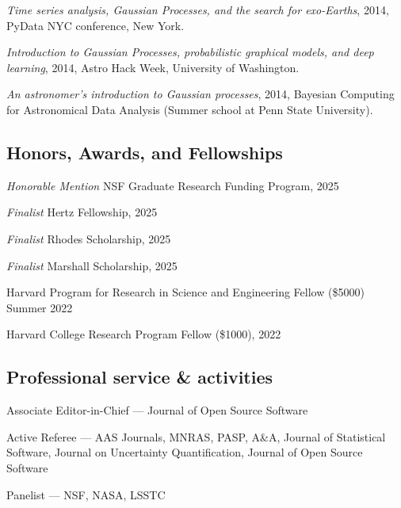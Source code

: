 \documentclass[12pt,letterpaper]{article}
\begin{document}
\begin{list}{}{\cvlist}
  \item \emph{Time series analysis, Gaussian Processes, and the search for
          exo-Earths},
        2014, PyData NYC conference, New York.

  \item \emph{Introduction to Gaussian Processes, probabilistic graphical
          models, and deep learning},
        2014, Astro Hack Week, University of Washington.

  \item \emph{An astronomer's introduction to Gaussian processes},
        2014, Bayesian Computing for Astronomical Data Analysis (Summer school at
        Penn State University).

\end{list}


\subsection{Honors, Awards, and Fellowships}
\begin{list}{}{\cvlist}

  \item \textit{Honorable Mention} NSF Graduate Research Funding Program, 2025
  \item \textit{Finalist} Hertz Fellowship, 2025
  \item \textit{Finalist} Rhodes Scholarship, 2025
  \item \textit{Finalist} Marshall Scholarship, 2025
  \item Harvard Program for Research in Science and Engineering Fellow (\$5000) Summer 2022
  \item Harvard College Research Program Fellow (\$1000), 2022

\end{list}


\subsection{Professional service \& activities}
\begin{list}{}{\cvlist}
  \item Associate Editor-in-Chief --- Journal of Open Source Software
  \item Active Referee ---
        AAS Journals,
        MNRAS,
        PASP,
        A\&A,
        Journal of Statistical Software,
        Journal on Uncertainty Quantification,
        Journal of Open Source Software
  \item Panelist ---
        NSF, NASA, LSSTC
\end{list}
\end{document}
